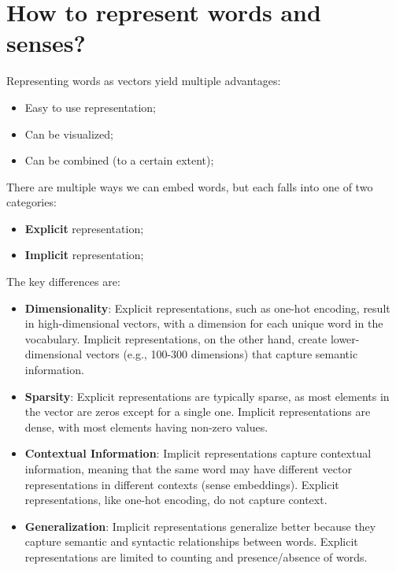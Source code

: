 \documentclass{article}
\begin{document}
\newpage

\section{How to represent words and senses?}

Representing words as vectors yield multiple advantages:

\begin{itemize}
    \item Easy to use representation;
    \item Can be visualized;
    \item Can be combined (to a certain extent);
\end{itemize}

There are multiple ways we can embed words, but each falls into one of two categories:

\begin{itemize}
    \item \textbf{Explicit} representation;
    \item \textbf{Implicit} representation;
\end{itemize}

The key differences are:

\begin{itemize}
    \item \textbf{Dimensionality}: Explicit representations, such as one-hot encoding, result in high-dimensional vectors, with a dimension for each unique word in the vocabulary. Implicit representations, on the other hand, create lower-dimensional vectors (e.g., 100-300 dimensions) that capture semantic information.

    \item \textbf{Sparsity}: Explicit representations are typically sparse, as most elements in the vector are zeros except for a single one. Implicit representations are dense, with most elements having non-zero values.

    \item \textbf{Contextual Information}: Implicit representations capture contextual information, meaning that the same word may have different vector representations in different contexts (sense embeddings). Explicit representations, like one-hot encoding, do not capture context.

    \item \textbf{Generalization}: Implicit representations generalize better because they capture semantic and syntactic relationships between words. Explicit representations are limited to counting and presence/absence of words.

\end{itemize}
\end{document}
